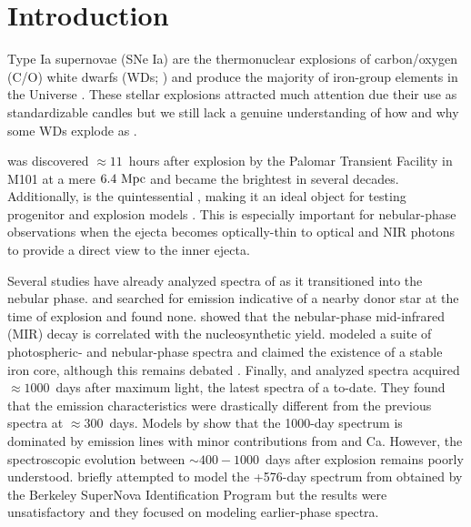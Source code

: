 \documentclass[twocolumn]{aastex63}
\begin{document}
\section{Introduction}\label{sec:intro}

Type Ia supernovae (SNe Ia) are the thermonuclear explosions of carbon/oxygen (C/O) white dwarfs (WDs; \citealp{hoyle1960}) and produce the majority of iron-group elements in the Universe \citep[e.g., ][]{iwamoto1999}. These stellar explosions attracted much attention due their use as standardizable candles \citep{phillips1993} but we still lack a genuine understanding of how and why some WDs explode as \sneia. 

\name was discovered $\approx 11$~hours after explosion by the Palomar Transient Facility \citep[PTF; ][]{law2009} in M101 at a mere $6.4~\rm{Mpc}$ \citep[e.g., ][]{shappee2011} and became the brightest \snia in several decades. Additionally, \name is the quintessential \snia \citep{pereira2013}, making it an ideal object for testing \snia progenitor and explosion models \citep[e.g., ][]{ropke2012}. This is especially important for nebular-phase observations when the ejecta becomes optically-thin to optical and NIR photons to provide a direct view to the inner ejecta. 

Several studies have already analyzed spectra of \name as it transitioned into the nebular phase. \citet{shappee2013} and \citet{lundqvist2015} searched for \Ha emission indicative of a nearby donor star at the time of explosion and found none. \citet{mcclelland2013} showed that the nebular-phase mid-infrared (MIR) decay is correlated with the nucleosynthetic yield. \citet{mazzali2015} modeled a suite of photospheric- and nebular-phase spectra and claimed the existence of a stable iron core, although this remains debated \citep[e.g., ][]{botyanszki2017}. Finally, \citet{taubenberger2015} and \citet{graham2015b} analyzed spectra acquired $\approx 1000$~days after maximum light, the latest spectra of a \snia to-date. They found that the emission characteristics were drastically different from the previous spectra at $\approx 300$~days. Models by \citet{fransson2015} show that the 1000-day spectrum is dominated by  emission lines with minor contributions from  and Ca. However, the spectroscopic evolution between $\sim 400-1000$~days after explosion remains poorly understood. \citet{friesen2017} briefly attempted to model the +576-day spectrum from \citet{graham2015b} obtained by the Berkeley SuperNova Identification Program \citep[BSNIP; ][]{silverman2012} but the results were unsatisfactory and they focused on modeling earlier-phase spectra. 
\end{document}

